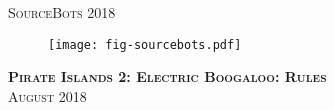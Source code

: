 \documentclass[twoside,12pt,a4paper,titlepage]{article}
\title{\gamename}
\author{\org}
\date{\timeline}
\newcommand{\gamename}{Pirate Islands 2: Electric Boogaloo\xspace}
\newcommand{\timeline}{August 2018\xspace}
\begin{document}
\begin{titlepage}
\begin{center}
\textsc{\large SourceBots 2018}\\[3.5cm]
\begin{figure}
    \centering
    \texttt{[image: fig-sourcebots.pdf]}
\end{figure}
\textsc{\huge \textbf{\gamename{}: Rules}}\\[1cm]
\textsc{\large \timeline}\\[3cm]
\end{center}
\end{titlepage}


\clearpage

\clearpage

\clearpage
\end{document}
